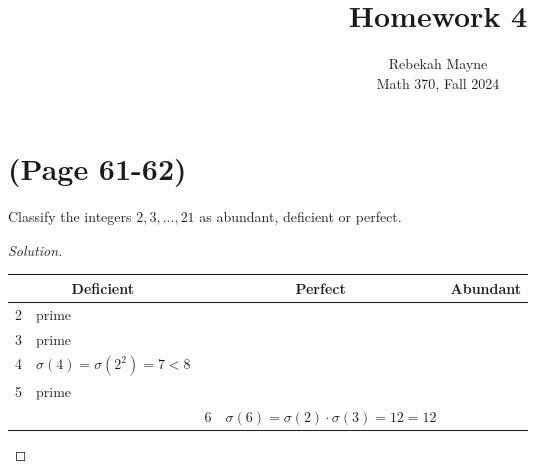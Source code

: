 \documentclass[11pt]{article}
\newenvironment{problem}[2][Problem]{\begin{trivlist}
\item[\hskip \labelsep {\bfseries #1}\hskip \labelsep {\bfseries #2.}]}{\end{trivlist}}
\newenvironment{solution}
  {\renewcommand\qedsymbol{$~$}\begin{proof}[Solution]$ $\par\nobreak\ignorespaces}
  {\end{proof}}
\begin{document}
\title{Homework 4}
\author{Rebekah Mayne\\
  Math 370, Fall 2024}
\maketitle


\section{(Page 61-62)}

\begin{problem}{3}
Classify the integers $2,3,..., 21$ as abundant, deficient or perfect.
\end{problem}

\begin{solution}
  \setlength{\tabcolsep}{2pt}
  {\small\begin{tabular}{l|l||l|l||l|l}
      \multicolumn{2}{c||}{\textbf{Deficient}} & \multicolumn{2}{c||}{\textbf{Perfect}}      & \multicolumn{2}{c}{\textbf{Abundant}}                                                                                                       \\ \hline
      2                                        & prime                                       &                                       &                                                &    &                                               \\
      3                                        & prime                                       &                                       &                                                &    &                                               \\
      4                                        & $\sigma(4)=\sigma(2^2)=7<8$                 &                                       &                                                &    &                                               \\
      5                                        & prime                                       &                                       &                                                &    &                                               \\
                                               &                                             & 6                                     & $\sigma(6)=\sigma(2)\cdot \sigma(3) = 12 =12 $ &    &                                               \\

\end{tabular}}
\end{solution}
\end{document}
